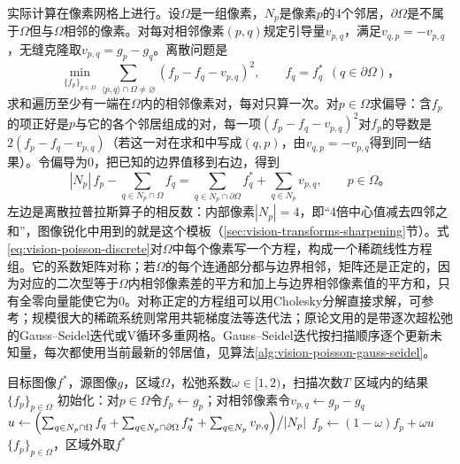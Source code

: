 实际计算在像素网格上进行。设$\Omega$是一组像素，$N_p$是像素$p$的4个邻居，$\partial\Omega$是不属于$\Omega$但与$\Omega$相邻的像素。对每对相邻像素$(p,q)$规定引导量$v_{p,q}$，满足$v_{q,p}=-v_{p,q}$，无缝克隆取$v_{p,q}=g_p-g_q$。离散问题是
\begin{equation*}
 \min_{\{f_p\}_{p\in\Omega}}
 \sum_{\langle p,q\rangle\cap\Omega\neq\varnothing}
 (f_p-f_q-v_{p,q})^2,
 \qquad f_q=f^*_q\ \ (q\in\partial\Omega)\text{，}
\end{equation*}
求和遍历至少有一端在$\Omega$内的相邻像素对，每对只算一次。对$p\in\Omega$求偏导：含$f_p$的项正好是$p$与它的各个邻居组成的对，每一项$(f_p-f_q-v_{p,q})^2$对$f_p$的导数是$2(f_p-f_q-v_{p,q})$（若这一对在求和中写成$(q,p)$，由$v_{q,p}=-v_{p,q}$得到同一结果）。令偏导为0，把已知的边界值移到右边，得到
\begin{equation}
 |N_p|\,f_p-\sum_{q\in N_p\cap\Omega}f_q
 =\sum_{q\in N_p\cap\partial\Omega}f^*_q
 +\sum_{q\in N_p}v_{p,q},
 \qquad p\in\Omega\text{。}
 \label{eq:vision-poisson-discrete}
\end{equation}
左边是离散拉普拉斯算子的相反数：内部像素$|N_p|=4$，即“4倍中心值减去四邻之和”，图像锐化中用到的就是这个模板（\ref{sec:vision-transforms-sharpening}节）。式\eqref{eq:vision-poisson-discrete}对$\Omega$中每个像素写一个方程，构成一个稀疏线性方程组。它的系数矩阵对称；若$\Omega$的每个连通部分都与边界相邻，矩阵还是正定的，因为对应的二次型等于$\Omega$内相邻像素差的平方和加上与边界相邻像素值的平方和，只有全零向量能使它为0。对称正定的方程组可以用Cholesky分解直接求解，可参考；规模很大的稀疏系统则常用共轭梯度法等迭代法；原论文用的是带逐次超松弛的Gauss–Seidel迭代或V循环多重网格。Gauss–Seidel迭代按扫描顺序逐个更新未知量，每次都使用当前最新的邻居值，见算法\ref{alg:vision-poisson-gauss-seidel}。

\begin{algorithm}
 \label{alg:vision-poisson-gauss-seidel}
 \begin{algorithmic}[1]
  \Require 目标图像$f^*$，源图像$g$，区域$\Omega$，松弛系数$\omega\in[1,2)$，扫描次数$T$
  \Ensure 区域内的结果$\{f_p\}_{p\in\Omega}$
  \State 初始化：对$p\in\Omega$令$f_p\gets g_p$；对相邻像素令$v_{p,q}\gets g_p-g_q$
    \State $u\gets\Bigl(\sum_{q\in N_p\cap\Omega}f_q+\sum_{q\in N_p\cap\partial\Omega}f^*_q+\sum_{q\in N_p}v_{p,q}\Bigr)\big/|N_p|$
    \State $f_p\gets(1-\omega)f_p+\omega u$
   \EndFor
  \EndFor
  \State \Return $\{f_p\}_{p\in\Omega}$，区域外取$f^*$
 \end{algorithmic}
\end{algorithm}

